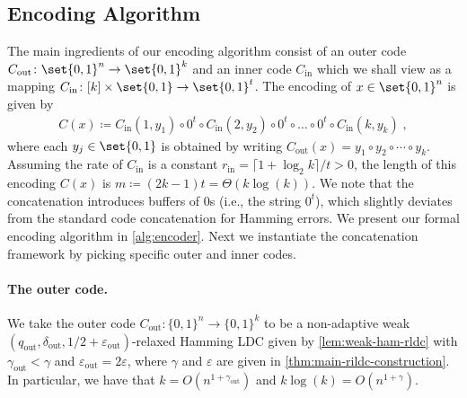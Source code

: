 \documentclass[10pt,a4paper]{article}
\theoremstyle{remark}
\newcommand{\etal}{\text{et al.}\xspace}
\newcommand{\zo}{\ensuremath{{\{0,1\}}}\xspace}
\newcommand{\eps}{\ensuremath{\varepsilon}}
\newcommand{\authnote}[3]{\textcolor{#2}{{\sf (#1's Note: {\sl{#3}})}}}
\newcommand{\alex}[1]{\authnote{Alex}{orange}{#1}}
\newcommand{\authnote}{}
\newcommand{\alex}[1]{}
\newcommand{\Cout}{C_{\text{out}}}
\newcommand{\dout}{\delta_{\text{out}}}
\newcommand{\qout}{q_{\text{out}}}
\newcommand{\epsout}{\eps_{\text{out}}}
\newcommand{\gammaout}{\gamma_{\text{out}}}
\newcommand{\Cin}{C_{\text{in}}}
\newcommand{\rin}{r_{\text{in}}}
\begin{document}

\subsection{Encoding Algorithm}\label{sec:wlrdc-enc}
The main ingredients of our encoding algorithm consist of an outer code $\Cout \colon \set{0,1}^n \rightarrow \set{0,1}^{k}$ and an inner code $\Cin$ which we shall view as a mapping $\Cin \colon [k] \times \set{0,1} \rightarrow \set{0,1}^{t}$. 
The encoding of $x \in \set{0,1}^n$ is given by %
\begin{align*}
	C(x) \coloneqq \Cin(1, y_1) \circ 0^t \circ \Cin(2, y_2) \circ 0^t \circ \dots \circ 0^t \circ \Cin(k, y_k)\; ,
\end{align*}
where each $y_j \in \set{0,1}$ is obtained by writing $\Cout(x)=y_1 \circ y_2 \circ \cdots \circ y_{k}$. %
Assuming the rate of $\Cin$ is a constant $\rin=\lceil 1+\log_2{k} \rceil /t > 0$, the length of this encoding $C(x)$ is $m\coloneqq (2k-1) t = \Theta(k\log(k))$. 
We note that the concatenation introduces buffers of 0s (i.e., the string $0^t$), which slightly deviates from the standard code concatenation for Hamming errors. 
We present our formal encoding algorithm in \cref{alg:encoder}.
Next we instantiate the concatenation framework by picking specific outer and inner codes.

\paragraph{The outer code.} We take the outer code $\Cout \colon \zo^n \rightarrow \zo^{k}$ to be a non-adaptive weak $(\qout,\dout,1/2 + \epsout)$-relaxed Hamming LDC given by \cref{lem:weak-ham-rldc} with $\gammaout < \gamma$ and $\epsout = 2\eps$, where $\gamma$ and $\eps$ are given in \cref{thm:main-rildc-construction}.
In particular, we have that $k = O(n^{1+\gammaout})$ and $k \log(k) = O(n^{1+\gamma})$.



\end{document}
